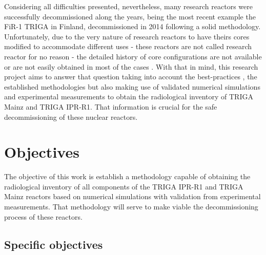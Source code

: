 \documentclass[11pt]{article} %
\begin{document}
Considering all difficulties presented, nevertheless, many research reactors were successfully decommissioned along the years, being the most recent example the FiR-1 TRIGA in Finland, decommissioned in 2014 \cite{Raty_Thesis_2020} following a solid methodology. Unfortunately, due to the very nature of research reactors to have theirs cores modified to accommodate different uses - these reactors are not called research reactor for no reason - the detailed history of core configurations are not available or are not easily obtained in most of the cases \cite[p. xxx]{Clean-up_CEA-e-DEN_2018}. With that in mind, this research project aims to answer that question taking into account the best-practices \cite{AIEA}, the established methodologies \cite{Raty_2024} but also making use of validated numerical simulations and experimental measurements to obtain the radiological inventory of TRIGA Mainz and TRIGA IPR-R1. That information is crucial for the safe decommissioning of these nuclear reactors. %





\section{Objectives}

The objective of this work is establish a methodology capable of obtaining the radiological inventory of all components of the TRIGA IPR-R1 and TRIGA Mainz reactors based on numerical simulations with validation from experimental measurements. That methodology will serve to make viable the decommissioning process of these reactors. 



\subsection{Specific objectives}

\end{document}
